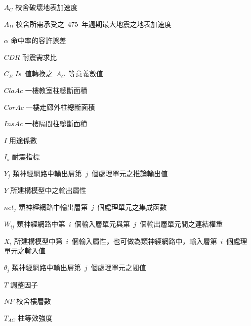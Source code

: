 %
\begin{SymEntry}

\item[$A_C$]
校舍破壞地表加速度

\item[$A_D$]
校舍所需承受之~475~年週期最大地震之地表加速度

\item[$\alpha$]
命中率的容許誤差

\item[$CDR$]
耐震需求比

\item[$C_E$]
$Is$~值轉換之~$A_C$~等意義數值

\item[$ClaAc$]
一樓教室柱總斷面積

\item[$CorAc$]
一樓走廊外柱總斷面積

\item[$InsAc$]
一樓隔間柱總斷面積

\item[$I$]
用途係數

\item[$I_s$]
耐震指標

\item[$Y_j$]
類神經網路中輸出層第~$j$~個處理單元之推論輸出值

\item[$Y$]
所建構模型中之輸出屬性

\item[$net_j$]
類神經網路中輸出層第~$j$~個處理單元之集成函數

\item[$W_{ij}$]
類神經網路中第~$i$~個輸入層單元與第~$j$~個輸出層單元間之連結權重

\item[$X_i$]
所建構模型中第~$i$~個輸入屬性，也可做為類神經網路中，輸入層第~$i$~個處理單元之輸入值

\item[$\theta_j$]
類神經網路中輸出層第~$j$~個處理單元之閥值

\item[$T$]
調整因子

\item[$NF$]
校舍樓層數

\item[$T_{AC}$]
柱等效強度


\end{SymEntry}
